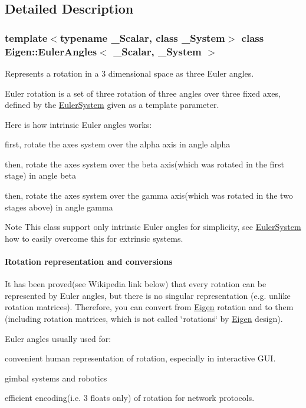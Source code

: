 \subsection{Detailed Description}
\subsubsection*{template$<$typename \+\_\+\+Scalar, class \+\_\+\+System$>$\newline
class Eigen\+::\+Euler\+Angles$<$ \+\_\+\+Scalar, \+\_\+\+System $>$}

Represents a rotation in a 3 dimensional space as three Euler angles. 

Euler rotation is a set of three rotation of three angles over three fixed axes, defined by the \hyperlink{class_eigen_1_1_euler_system}{Euler\+System} given as a template parameter.

Here is how intrinsic Euler angles works\+:
\begin{DoxyItemize}
\item first, rotate the axes system over the alpha axis in angle alpha
\item then, rotate the axes system over the beta axis(which was rotated in the first stage) in angle beta
\item then, rotate the axes system over the gamma axis(which was rotated in the two stages above) in angle gamma
\end{DoxyItemize}

\begin{DoxyNote}{Note}
This class support only intrinsic Euler angles for simplicity, see \hyperlink{class_eigen_1_1_euler_system}{Euler\+System} how to easily overcome this for extrinsic systems.
\end{DoxyNote}
\paragraph*{Rotation representation and conversions}

It has been proved(see Wikipedia link below) that every rotation can be represented by Euler angles, but there is no singular representation (e.\+g. unlike rotation matrices). Therefore, you can convert from \hyperlink{namespace_eigen}{Eigen} rotation and to them (including rotation matrices, which is not called \char`\"{}rotations\char`\"{} by \hyperlink{namespace_eigen}{Eigen} design).

Euler angles usually used for\+:
\begin{DoxyItemize}
\item convenient human representation of rotation, especially in interactive G\+UI.
\item gimbal systems and robotics
\item efficient encoding(i.\+e. 3 floats only) of rotation for network protocols.
\end{DoxyItemize}

